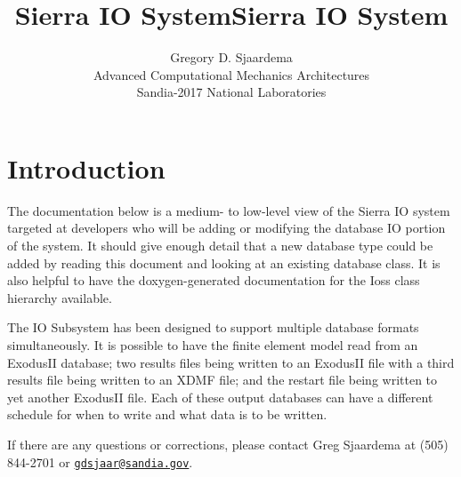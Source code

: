 \documentclass[11pt,twoside]{article}
\title{Sierra IO System}
\begin{document}
\clearpage\pagestyle{Standard}
\title{Sierra IO System}
\author{Gregory D. Sjaardema\\
	Advanced Computational Mechanics Architectures\\
	Sandia-2017 National Laboratories}

\maketitle

\setcounter{tocdepth}{3}
\setlength{\parskip}{0ex plus 0.5ex minus 0.2ex}
\tableofcontents

\section{Introduction}
The documentation below is a medium{}- to low{}-level view of the Sierra
IO system targeted at developers who will be adding or modifying the
database IO portion of the system. It should give enough detail that a
new database type could be added by reading this document and looking
at an existing database class. It is also helpful to have the
doxygen{}-generated documentation for the Ioss class hierarchy
available.

The IO Subsystem has been designed to support multiple database formats
simultaneously. It is possible to have the finite element model read
from an ExodusII database; two results files being written to an
ExodusII file with a third results file being written to an XDMF file;
and the restart file being written to yet another ExodusII file. Each of
these output databases can have a different schedule for when to write
and what data is to be written.

If there are any questions or corrections, please contact Greg Sjaardema
at (505) 844{}-2701 or \href{mailto:gdsjaar@sandia.gov}{\nolinkurl{gdsjaar@sandia.gov}}.

\setlength{\parskip}{1ex plus 0.5ex minus 0.2ex}
\end{document}
